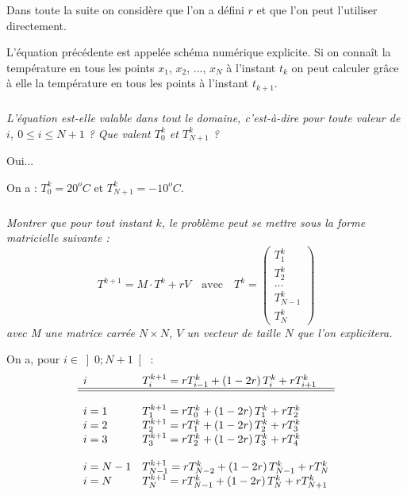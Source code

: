 \documentclass[10pt,fleqn]{article} %
\begin{document}
\begin{multicols}{2}
\ifprof
\else
\vspace{.5cm}

Dans toute la suite on considère que l'on a défini $r$ et que l'on peut l'utiliser directement. 
\vspace{.5cm}

L'équation précédente est appelée schéma numérique explicite. Si on connaît la température en tous les points $x_1$, $x_2$, ..., $x_N$ à  l'instant $t_k$ on peut calculer grâce à elle la température en tous les points à l'instant $t_{k+1}$.
\fi

\subparagraph{}\textit{L'équation est-elle valable dans tout le domaine, c'est-à-dire pour toute valeur de $i$, $0\leq i\leq N+1$ ? Que valent $T_0^k$ et $T_{N+1}^k$ ?}
\ifprof

\begin{corrige}
Oui...

On a : $T_0^k = 20^o C$ et $T^k_{N+1}=-10^o C$.  
\end{corrige}
\else
\fi


\subparagraph{}\textit{Montrer que pour tout instant $k$, le problème peut se mettre sous la forme matricielle suivante : }
$$
T^{k+1} = M \cdot T^k + rV \quad \text{avec} \quad T^k =
 \begin{pmatrix} T_1^k \\  T_2 ^k \\ ... \\  T_{N-1}^{k} \\ T_{N}^{k}  \end{pmatrix}
$$
\textit{avec M une matrice carrée $N\times N$, $V$ un vecteur de taille $N$ que l'on explicitera.}
\ifprof
\begin{corrige}
On a, pour $i\in \left]0;N+1 \right[$ :
$$
\begin{array}{ll}
i & T_{i}^{k+1} = r T_{i-1}^{k} + \left( 1-2r \right) T_i^k + r T_{i+1}^k \\
\hline 
\hline 
\\
i=1 & T_{1}^{k+1} = r T_{0}^{k} + \left( 1-2r \right) T_1^k + r T_{2}^k \\
i=2 & T_{2}^{k+1} = r T_{1}^{k} + \left( 1-2r \right) T_2^k + r T_{3}^k \\
i=3 & T_{3}^{k+1} = r T_{2}^{k} + \left( 1-2r \right) T_3^k + r T_{4}^k \\
&\\
i=N -1& T_{N -1}^{k+1} = r T_{N -2}^{k} + \left( 1-2r \right) T_{N -1}^k + r T_{N}^k \\
i=N & T_{N}^{k+1} = r T_{N-1}^{k} + \left( 1-2r \right) T_N^k + r T_{N+1}^k \\
\end{array}
$$ 


\end{corrige}
\end{multicols}
\end{document}
